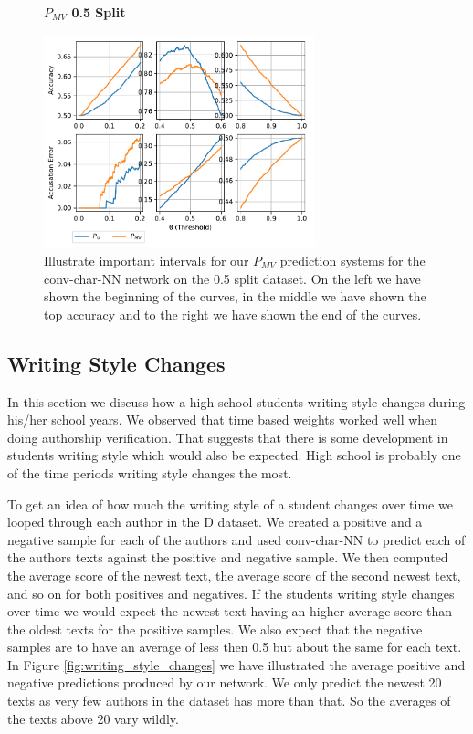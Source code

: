 \begin{description}
        \begin{figure}
            \centering
            \textbf{$P_{MV}$ 0.5 Split}\par\medskip
            \includegraphics[width=0.7\textwidth]{./pictures/discussion/conv_char_nn_prediction_zoom_50_majority_vote}
            \caption{Illustrate important intervals for our $P_{MV}$ prediction
                systems for the \gls{conv-char-NN} network on the 0.5 split
                dataset. On the left we have shown the beginning of the curves,
                in the middle we have shown the top accuracy and to the right we
                have shown the end of the curves.}
            \label{fig:conv_char_prediction_zoom_50_majority_vote}
        \end{figure}

\end{description}


\subsection{Writing Style Changes}

In this section we discuss how a high school students writing style changes
during his/her school years. We observed that time based weights worked well
when doing authorship verification. That suggests that there is some development
in students writing style which would also be expected. High school is probably
one of the time periods writing style changes the most.

To get an idea of how much the writing style of a student changes over time we
looped through each author in the \gls{D} dataset. We created a positive and a
negative sample for each of the authors and used \gls{conv-char-NN} to predict
each of the authors texts against the positive and negative sample. We then
computed the average score of the newest text, the average score of the second
newest text, and so on for both positives and negatives. If the students writing
style changes over time we would expect the newest text having an higher average
score than the oldest texts for the positive samples. We also expect that the
negative samples are to have an average of less then 0.5 but about the same
for each text. In Figure \ref{fig:writing_style_changes} we have illustrated
the average positive and negative predictions produced by our network. We only
predict the newest 20 texts as very few authors in the dataset has more than
that. So the averages of the texts above 20 vary wildly.

